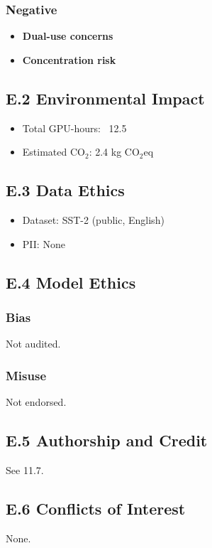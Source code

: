 \subsubsection{Negative}
\begin{itemize}
\item \textbf{Dual-use concerns}
\item \textbf{Concentration risk}

\end{itemize}
\subsection{E.2 Environmental Impact}

\begin{itemize}
\item Total GPU-hours: ~12.5
\item Estimated CO$_2$: 2.4 kg CO$_2$eq

\end{itemize}
\subsection{E.3 Data Ethics}

\begin{itemize}
\item Dataset: SST-2 (public, English)
\item PII: None

\end{itemize}
\subsection{E.4 Model Ethics}

\subsubsection{Bias}
Not audited.

\subsubsection{Misuse}
Not endorsed.

\subsection{E.5 Authorship and Credit}
See  11.7.

\subsection{E.6 Conflicts of Interest}
None.

